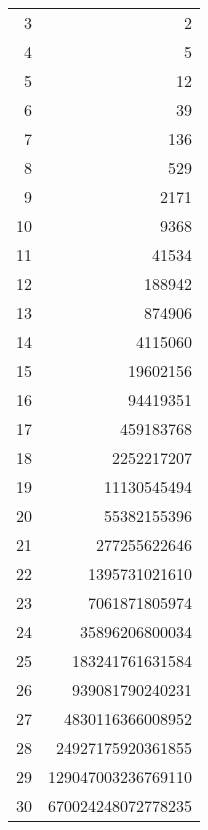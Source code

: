 \documentclass[distribution,draft]{brandiss} %
\numberwithin{section}{chapter}
\numberwithin{figure}{chapter}
\begin{document}
\begin{table}[htb]
{\begin{tabular}{r | r}
      3 & 2 \\
      4 & 5 \\
      5 & 12 \\
      6 & 39 \\
      7 & 136 \\
      8 & 529 \\
      9 & 2171 \\
      10 & 9368 \\
      11 & 41534 \\
      12 & 188942 \\
      13 & 874906 \\
      14 & 4115060 \\
      15 & 19602156 \\
      16 & 94419351 \\
      17 & 459183768 \\
      18 & 2252217207 \\
      19 & 11130545494 \\
      20 & 55382155396 \\
      21 & 277255622646 \\
      22 & 1395731021610 \\
      23 & 7061871805974 \\
      24 & 35896206800034 \\
      25 & 183241761631584 \\
      26 & 939081790240231 \\
      27 & 4830116366008952 \\
      28 & 24927175920361855 \\
      29 & 129047003236769110 \\
      30 & 670024248072778235
    \end{tabular}
  }
\end{table}
\end{document}
